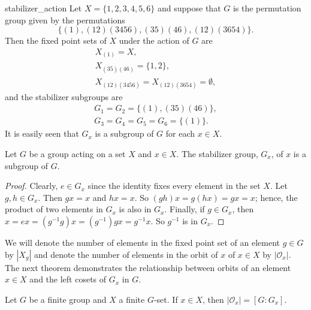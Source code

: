  
\begin{example}{stabilizer_action}
Let $X = \{1, 2, 3, 4, 5, 6\}$ and suppose that $G$ is the permutation
group given by the permutations 
\[
\{
(1), (1 2)(3 4 5 6), (3 5)(4 6), (1 2)( 3 6 5 4)
\}.
\]
Then the fixed point sets  of $X$ under the action of $G$ are
\begin{gather*}
X_{(1)}  =  X, \\
X_{(3 5)(4 6)}  =  \{1,2\}, \\
X_{(1 2)(3 4 5 6)}  = X_{(1 2)(3 6 5 4)}  =  \emptyset,
\end{gather*}
and the stabilizer subgroups are
\begin{gather*}
G_1 =  G_2  =  \{(1), (3 5)(4 6) \}, \\
G_3  = G_4  = G_5  = G_6 =  \{(1)\}.
\end{gather*}
It is easily  seen that  $G_x$ is a subgroup of $G$ for each $x \in
X$. 
\end{example}
 
 
\begin{proposition}
Let $G$ be a  group acting on a set $X$ and $x \in X$. The stabilizer
group, $G_x$, of $x$ is a subgroup of $G$. 
\end{proposition}
 
 
\begin{proof}
Clearly,  $e \in G_x$ since the identity fixes every element in the
set $X$. Let $g, h \in G_x$. Then $gx = x$ and $hx = x$. So $(gh)x =
g(hx) = gx = x$; hence, the product of two elements in $G_x$ is also
in $G_x$. Finally, if $g \in G_x$, then $x = ex = (g^{-1}g)x =
(g^{-1})gx = g^{-1} x$. So $g^{-1}$ is in $G_x$. 
\end{proof}
 
 
\medskip
 
 
We will denote the number of elements in the fixed point set of an
element $g \in G$ by $|X_g|$ and denote the number of elements in the
orbit of $x$ of $x \in X$ by $|{\mathcal O}_x|$. The next theorem
demonstrates the relationship between orbits of an element $x \in X$
and the left cosets of $G_x$ in $G$.
 
 
\begin{theorem}\label{orbit_theorem}
Let $G$ be a finite group and $X$ a finite $G$-set. If $x \in X$,
then $|{\mathcal O}_x| = [G:G_x]$. 
\end{theorem}
 
